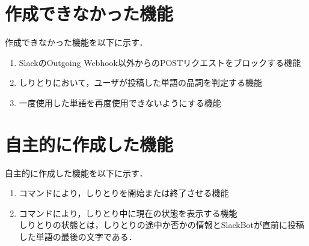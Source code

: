 \documentclass[12pt]{jsarticle}
\begin{document}
\section{作成できなかった機能}
作成できなかった機能を以下に示す．
\begin{enumerate}
\item SlackのOutgoing Webhook以外からのPOSTリクエストをブロックする機能
\item しりとりにおいて，ユーザが投稿した単語の品詞を判定する機能
\item 一度使用した単語を再度使用できないようにする機能
\end{enumerate}

\section{自主的に作成した機能}
自主的に作成した機能を以下に示す．
\begin{enumerate}
\item コマンドにより，しりとりを開始または終了させる機能
\item コマンドにより，しりとり中に現在の状態を表示する機能\\
しりとりの状態とは，しりとりの途中か否かの情報とSlackBotが直前に投稿した単語の最後の文字である．
\end{enumerate}




\end{document}
